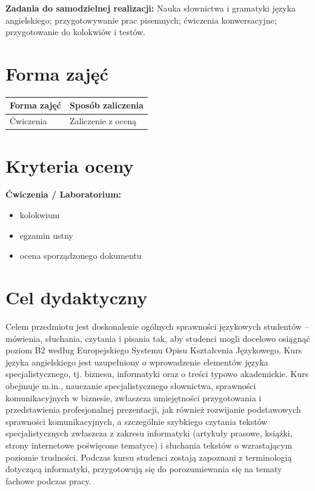 \documentclass[12pt, a4paper]{article}
\newcommand{\thdrule}{\noalign{\global\setlength{\extrarowheight}{0pt}}}
\newcommand{\thdend}{\noalign{\global\setlength{\extrarowheight}{3pt}}}
\begin{document}
\vspace{4pt}
\noindent\textbf{Zadania do samodzielnej realizacji:} Nauka słownictwa i gramatyki języka angielskiego; przygotowywanie prac pisemnych; ćwiczenia konwersacyjne; przygotowanie do kolokwiów i testów.

\section{Forma zajęć}

\begin{center}
{\scriptsize
\begin{tabular}{m{5cm}m{8cm}}
\thdrule\toprule
\rowcolor{pjatkRed} {\color{white}\textbf{Forma zajęć}} & {\color{white}\textbf{Sposób zaliczenia}} \\
\midrule\thdend
  \rowcolor{tableRowLight} Ćwiczenia & Zaliczenie z oceną \\
\bottomrule
\end{tabular}}
\end{center}

\section{Kryteria oceny}

\textbf{Ćwiczenia / Laboratorium:}
\begin{itemize}
  \item kolokwium
  \item egzamin ustny
  \item ocena sporządzonego dokumentu
\end{itemize}


\section{Cel dydaktyczny}

Celem przedmiotu jest doskonalenie ogólnych sprawności językowych studentów – mówienia, słuchania, czytania i pisania tak, aby studenci mogli docelowo osiągnąć poziom B2 według Europejskiego Systemu Opisu Kształcenia Językowego. Kurs języka angielskiego jest uzupełniony o wprowadzenie elementów języka specjalistycznego, tj. biznesu, informatyki oraz o treści typowo akademickie. Kurs obejmuje m.in., nauczanie specjalistycznego słownictwa, sprawności komunikacyjnych w biznesie, zwłaszcza umiejętności przygotowania i przedstawienia profesjonalnej prezentacji, jak również rozwijanie podstawowych sprawności komunikacyjnych, a szczególnie szybkiego czytania tekstów specjalistycznych zwłaszcza z zakresu informatyki (artykuły prasowe, książki, strony internetowe poświęcone tematyce) i słuchania tekstów o wzrastającym poziomie trudności. Podczas kursu studenci zostają zapoznani z terminologią dotyczącą informatyki, przygotowują się do porozumiewania się na tematy fachowe podczas pracy. 
\end{document}
